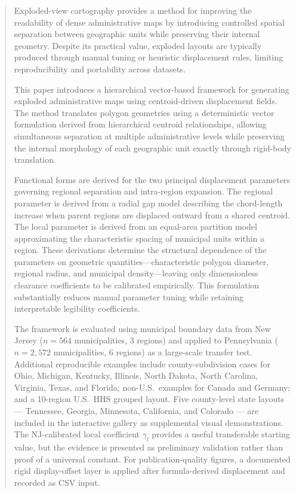 \documentclass[12pt, a4paper]{article}
\numberwithin{equation}{section}
\begin{document}
\begin{abstract}
\noindent
Exploded-view cartography provides a method for improving the readability of dense administrative maps by introducing controlled spatial separation between geographic units while preserving their internal geometry. Despite its practical value, exploded layouts are typically produced through manual tuning or heuristic displacement rules, limiting reproducibility and portability across datasets.

This paper introduces a hierarchical vector-based framework for generating exploded administrative maps using centroid-driven displacement fields. The method translates polygon geometries using a deterministic vector formulation derived from hierarchical centroid relationships, allowing simultaneous separation at multiple administrative levels while preserving the internal morphology of each geographic unit exactly through rigid-body translation.

Functional forms are derived for the two principal displacement parameters governing regional separation and intra-region expansion. The regional parameter is derived from a radial gap model describing the chord-length increase when parent regions are displaced outward from a shared centroid. The local parameter is derived from an equal-area partition model approximating the characteristic spacing of municipal units within a region. These derivations determine the structural dependence of the parameters on geometric quantities---characteristic polygon diameter, regional radius, and municipal density---leaving only dimensionless clearance coefficients to be calibrated empirically. This formulation substantially reduces manual parameter tuning while retaining interpretable legibility coefficients.

The framework is evaluated using municipal boundary data from New Jersey ($n = 564$ municipalities, 3 regions) and applied to Pennsylvania ($n = 2{,}572$ municipalities, 6 regions) as a large-scale transfer test. Additional reproducible examples include county-subdivision cases for Ohio, Michigan, Kentucky, Illinois, North Dakota, North Carolina, Virginia, Texas, and Florida; non-U.S.\ examples for Canada and Germany; and a 10-region U.S.\ HHS grouped layout. Five county-level state layouts --- Tennessee, Georgia, Minnesota, California, and Colorado --- are included in the interactive gallery as supplemental visual demonstrations. The NJ-calibrated local coefficient $\gamma_l$ provides a useful transferable starting value, but the evidence is presented as preliminary validation rather than proof of a universal constant. For publication-quality figures, a documented rigid display-offset layer is applied after formula-derived displacement and recorded as CSV input.


\end{abstract}
\end{document}
